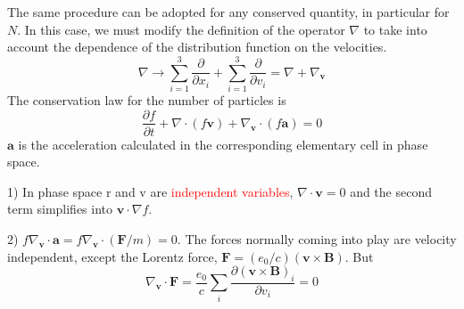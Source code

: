 \documentclass[12pt,a4paper]{article}
\renewcommand{\vec}[1]{\boldsymbol{#1}}
\begin{document}
The same procedure can be adopted for any conserved quantity, in particular for $N$. In this case, we must modify the definition of the operator $\nabla$ to take into account the dependence of the distribution function on the velocities. 
\begin{equation*}
\nabla \rightarrow \sum_{i=1}^3 \frac{\partial}{\partial x_i} +\sum_{i=1}^3 \frac{\partial}{\partial v_i} = \nabla + \nabla_{\vec{v}}
\end{equation*}
The conservation law for the number of particles is
\begin{equation}
\frac{\partial f}{\partial t} +\nabla\cdot (f\vec{v}) +\nabla_{\vec{v}}\cdot (f\vec{a}) = 0
\end{equation}
$\vec{a}$ is the acceleration calculated in the corresponding elementary cell in phase space. 

1) In phase space r and v are \textcolor{red}{independent variables}, $\nabla \cdot \vec{v} = 0$ and the second term simplifies into $\vec{v}\cdot \nabla f$. 

2) $f\nabla_{\vec{v}}\cdot \vec{a} = f\nabla_{\vec{v}}\cdot (\vec{F}/m) = 0$. The forces normally coming into play are velocity independent, except the Lorentz force, $\vec{F} = (e_0/c)(\vec{v} \times \vec{B})$. But
\begin{equation*}
\nabla_{\vec{v}}\cdot \vec{F} = \frac{e_0}{c} \sum_i \frac{\partial (\vec{v} \times \vec{B})_i}{\partial v_i} = 0
\end{equation*}
\end{document}
